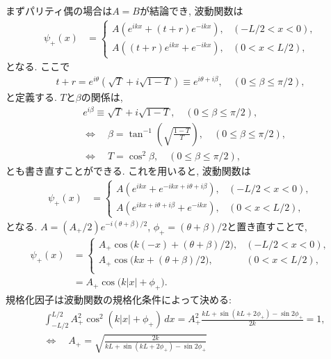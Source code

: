 \documentclass[10pt,a4j]{jarticle}
\begin{document}
まずパリティ偶の場合は$A=B$が結論でき, 波動関数は
\begin{align}
\psi_{+}(x) &= \left\{ \begin{array}{ll} A (e^{ik x} + (t+r) e^{-ik x}), & (-L/2 < x<0), \\
A ((t+r) e^{ik x} + e^{-ik x} ), & (0<x<L/2), \end{array} \right.
\end{align}
となる. ここで
\begin{align}
t + r = e^{i \theta} (\sqrt{T} + i \sqrt{1-T}) \equiv e^{i\theta + i \beta}, \quad (0 \le \beta \le \pi/2),
\end{align}
と定義する. $T$と$\beta$の関係は, 
\begin{align}
& e^{i  \beta} \equiv \sqrt{T} + i \sqrt{1-T}, \quad (0 \le \beta \le \pi/2 ) , \nonumber \\
& \Longleftrightarrow \quad \beta = \tan^{-1} \left( \sqrt{\frac{1-T}{T}} \right) ,  \quad (0 \le \beta \le \pi/2 ), \nonumber \\
& \Longleftrightarrow \quad T = \cos^2 \beta,  \quad (0 \le \beta \le \pi/2 )  , 
\label{eq:betaformula}
\end{align}
とも書き直すことができる. これを用いると, 波動関数は
\begin{align}
\psi_{+}(x) &= \left\{ \begin{array}{ll} A (e^{ik x} + e^{-ik x + i \theta + i\beta}), & (-L/2 < x<0), \\
A (e^{ik x + i\theta + i\beta} + e^{-ik x} ), & (0<x<L/2), \end{array} \right.
\end{align}
となる. $A=(A_+/2) e^{-i(\theta + \beta)/2}$, $\phi_+ = (\theta+\beta)/2$と置き直すことで, 
\begin{align}
\psi_{+}(x) &= \left\{ \begin{array}{ll} A_+ \cos \bigl( k(-x) + (\theta + \beta)/2\bigr), & (-L/2 < x<0), \\
A_+ \cos \bigl( k x + (\theta + \beta)/2\bigr), & (0<x<L/2), \\ \end{array} \right. \\
& = A_+ \cos \bigl( k|x| + \phi_+).
\end{align}
規格化因子は波動関数の規格化条件によって決める:
\begin{align}
& \int_{-L/2}^{L/2} A^2_+ \cos^2(k|x|+\phi_+) \, dx
= A^2_+ \frac{k L + \sin (kL + 2\phi_+)- \sin 2\phi_+}{2 k} = 1, \\
& \Longleftrightarrow \quad A_+ = \sqrt{\frac{2k}{k L + \sin(k L + 2\phi_+) - \sin 2\phi_+ }}
\end{align}
\end{document}
